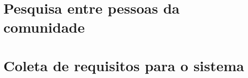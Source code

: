 \chapter{Pesquisa entre pessoas da comunidade}
\label{ch:pesquisa}



\chapter{Coleta de requisitos para o sistema}
\label{ch:coleta-requisitos}



